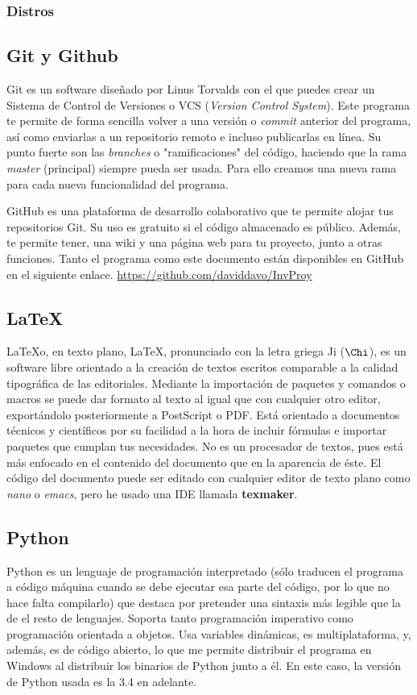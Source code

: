 \documentclass[a4paper, 11pt, twoside]{report} %
\begin{document}
\subsubsection*{Distros}

\subsection{Git y Github}
Git es un software diseñado por Linus Torvalds con el que puedes crear un Sistema de Control de Versiones o VCS (\textit{Version Control System}). Este programa te permite de forma sencilla volver a una versión o \textit{commit} anterior del programa, así como enviarlas a un repositorio remoto e incluso publicarlas en línea. Su punto fuerte son las \textit{branches} o "ramificaciones" del código, haciendo que la rama \textit{master} (principal) siempre pueda ser usada. Para ello creamos una nueva rama para cada nueva funcionalidad del programa.

GitHub es una plataforma de desarrollo colaborativo que te permite alojar tus repositorios Git. Su uso es gratuito si el código almacenado es público. Además, te permite tener, una wiki y una página web para tu proyecto, junto a otras funciones.
Tanto el programa como este documento están disponibles en GitHub en el siguiente enlace. \url{https://github.com/daviddavo/InvProy}

\subsection{LaTeX}
\LaTeX\space o, en texto plano, LaTeX, pronunciado con la letra griega 
Ji ($\Chi$), es un software libre orientado a la creación de textos escritos comparable a la calidad tipográfica de las editoriales. Mediante la importación de paquetes y comandos o macros se puede dar formato al texto al igual que con cualquier otro editor, exportándolo posteriormente a PostScript o PDF. Está orientado a documentos técnicos y científicos por su facilidad a la hora de incluir fórmulas e importar paquetes que cumplan tus necesidades. No es un procesador de textos, pues está más enfocado en el contenido del documento que en la aparencia de éste.
El código del documento puede ser editado con cualquier editor de texto plano como \textit{nano} o \textit{emacs}, pero he usado una IDE llamada \textbf{texmaker}.

\subsection{Python}
Python es un lenguaje de programación interpretado (sólo traducen el programa a código máquina cuando se debe ejecutar esa parte del código, por lo que no hace falta compilarlo) que destaca por pretender una sintaxis más legible que la de el resto de lenguajes. Soporta tanto programación imperativo como programación orientada a objetos. Usa variables dinámicas, es multiplataforma, y, además, es de código abierto, lo que me permite distribuir el programa en Windows al distribuir los binarios de Python junto a él. En este caso, la versión de Python usada es la 3.4 en adelante.
\end{document}
